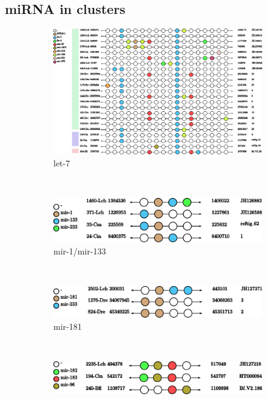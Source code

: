 \documentclass[graybox]{svmult}
\begin{document}
\subsection{miRNA in clusters}

\begin{figure}[ht!]
\centering
    \begin{subfigure}[t]{1.0\textwidth}
        \centering
        \includegraphics[height=9 cm]{./Images/Cluster_images/let-7_101_128}
        \caption{let-7}
    \end{subfigure}
    \\
    \begin{subfigure}[t]{0.45\textwidth}
        \centering
        \includegraphics[height=1.2 cm]{./Images/Cluster_images/mir-1_119_33}
        \caption{mir-1/mir-133}
     \end{subfigure}
        ~
     \\
    \begin{subfigure}[t]{0.45\textwidth}
        \centering
        \includegraphics[height=1.2 cm]{./Images/Cluster_images/mir-181_105_2502}
        \caption{mir-181}
       \end{subfigure}
        ~
         \begin{subfigure}[t]{0.45\textwidth}
        \centering
        \includegraphics[height=1.2 cm]{./Images/Cluster_images/mir-183_132_240}

\end{subfigure}
\end{figure}
\end{document}
